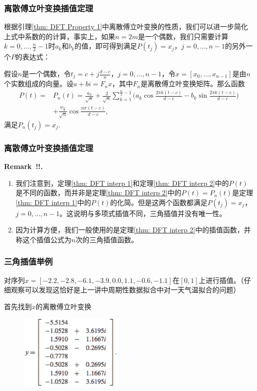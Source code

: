 \documentclass[10pt]{beamer}
\newcounter{remark}
\def\openrem#1#2{\refstepcounter{remark}\bigskip

{\noindent\bf#1~\theremark\if#2!{. }\else{ (#2).}\fi}
\it}
\def\thmskip{}
\newenvironment{remark}[1][!]{\openrem{Remark}{#1}}{\thmskip}
\def\thmskip{}
\begin{document}
\begin{frame}
\frametitle{离散傅立叶变换插值定理}
根据引理\ref{thm: DFT Property 1}中离散傅立叶变换的性质，我们可以进一步简化上式中系数的的计算，事实上，如果$n = 2m$是一个偶数，我们只需要计算$k = 0, \ldots, \frac{n}{2} -1$时$a_k$和$b_k$的值，即可得到满足$P(t_j) = x_j$，$j = 0, \ldots, n-1$的另外一个$P$的表达式：
\begin{theorem}[离散傅立叶变换插值定理]
\label{thm: DFT interp 2}
假设$n$是一个偶数，令$t_j = c + j\frac{d-c}{n}$，$j = 0, \ldots, n-1$，令$x = [x_0, \ldots, x_{n-1}]$是由$n$个实数组成的向量。设$a + b i = F_n x$，其中$F_n$是离散傅立叶变换矩阵。那么函数
\begin{align}
P(t) = &P_n(t) =  \frac{a_0}{\sqrt{n}} + \frac{2}{\sqrt{n}} \sum_{k=1}^{\frac{n}{2}-1} \big(a_k \cos \frac{2 \pi k (t-c)}{d-c} - b_k \sin \frac{2 \pi k (t-c)}{d-c}  \big) \nonumber \\
       &+ \frac{a_{\frac{n}{2}}}{\sqrt{n}} \cos \frac{n\pi(t-c)}{d-c},
\end{align}
满足$P_n(t_j) = x_j$.
\end{theorem}
\end{frame}


\begin{frame}
\frametitle{离散傅立叶变换插值定理}
\begin{remark}
\begin{enumerate}
\item 我们注意到，定理\ref{thm: DFT interp 1}和定理\ref{thm: DFT interp 2}中的$P(t)$是不同的函数，而并非是定理\ref{thm: DFT interp 2}中的$P(t) = P_n(t)$是定理\ref{thm: DFT interp 1}中的$P(t)$的化简。但是这两个函数都满足$P(t_j) = x_j$，$j = 0, \ldots, n-1$。这说明与多项式插值不同，三角插值并没有唯一性。
\item 因为计算方便，我们一般使用的是定理\eqref{thm: DFT interp 2}中的插值函数，并称这个插值公式为$n$次的三角插值函数。
\end{enumerate}
\end{remark}
\end{frame}


\begin{frame}
\frametitle{三角插值举例}
\begin{example}
对序列$x = [-2.2, -2.8, -6.1, -3.9, 0.0, 1.1, -0.6, -1.1]$在$[0,1]$上进行插值。（仔细观察可以发现这恰好是上一讲中周期性数据拟合中对一天气温拟合的问题）
\end{example}
首先找到$x$的离散傅立叶变换
\begin{figure}
\includegraphics[width=5cm]{figs/10-2-1_DFT_Interp-2} 
\end{figure}
\end{frame}
\end{document}

